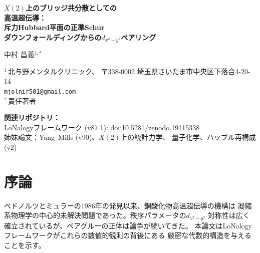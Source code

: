 \documentclass[12pt]{article}
\theoremstyle{plain}
\theoremstyle{definition}
\numberwithin{equation}{section}
\newcommand{\br}{\mathrm{br}}
\DeclareMathOperator{\Cov}{Cov}
\begin{document}
\begin{titlepage}
\centering
\vspace*{0.8cm}
{\LARGE\bfseries $X(2)$上のブリッジ共分散としての\\[6pt]
高温超伝導：\\[6pt]
斥力Hubbard平面の正準Schur\\[6pt]
ダウンフォールディングからの$d_{x^2-y^2}$ペアリング}
\vspace{1.2cm}

{\large 中村 昌義$^{1,*}$}
\vspace{0.6cm}

{\normalsize
$^1$\,北与野メンタルクリニック、
〒338-0002 埼玉県さいたま市中央区下落合4-20-14\\
\texttt{mjolnir501@gmail.com}\\[4pt]
$^*$\,責任著者
}
\vspace{0.6cm}

{\small
\noindent\textbf{関連リポジトリ：}\\
LoNalogyフレームワーク (v87.1):
\href{https://doi.org/10.5281/zenodo.19115338}{doi:10.5281/zenodo.19115338}\\
姉妹論文：Yang--Mills (v90)、$X(2)$上の統計力学、
量子化学、ハッブル再構成 (v2)
}
\vspace{0.8cm}

\begin{abstract}
\noindent
銅酸化物高温超伝導の微視的機構は30年以上にわたり完全な合意がない。
LoNalogyの正準ブリッジ分解を正方格子上の斥力Hubbardモデルに適用し、
最小機構を示す：
(i) オンサイト斥力$U$はdoublon-holonブリッジのSchur消去により
最近接一重項結合引力$-Jb_{ij}^\dagger b_{ij}$に変わる。
(ii) ペアグルーはブリッジ共分散
$\mathcal{C}_d^{\br}=\beta\Cov(B_d,B_d)$でありフォノンではない。
(iii) 主要不安定性チャンネルは$C_{4v}$対称性と
反強磁性的符号構造により$d_{x^2-y^2}$。
$2\times2$プラケットベンチマークは$d$波支配を確認。
\end{abstract}
\end{titlepage}

\setcounter{page}{1}
\tableofcontents
\newpage

\section*{序論}

ベドノルツとミュラーの1986年の発見以来、銅酸化物高温超伝導の機構は
凝縮系物理学の中心的未解決問題であった。秩序パラメータの$d_{x^2-y^2}$
対称性は広く確立されているが、ペアグルーの正体は論争が続いてきた。
本論文はLoNalogyフレームワークがこれらの数値的観測の背後にある
厳密な代数的構造を与えることを示す。
\end{document}
